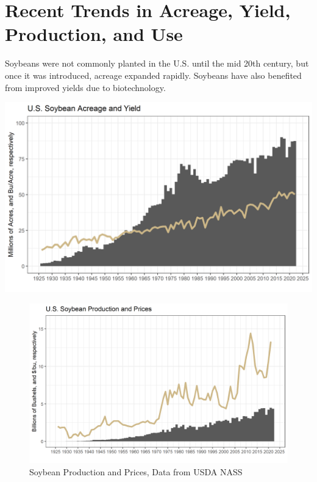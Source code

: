 \documentclass[
]{book}
\begin{document}
\hypertarget{recent-trends-in-acreage-yield-production-and-use-1}{%
\section{Recent Trends in Acreage, Yield, Production, and Use}\label{recent-trends-in-acreage-yield-production-and-use-1}}

Soybeans were not commonly planted in the U.S. until the mid 20th century, but once it was introduced, acreage expanded rapidly. Soybeans have also benefited from improved yields due to biotechnology.

\href{Soybean\%20Acres\%20and\%20Yield,\%20Data\%20from\%20USDA\%20NASS}{\includegraphics{assets/PrimerforGrain_SoyAcandY.png}}

\begin{figure}
\centering
\includegraphics{assets/PrimerforGrain_SoyProdand$.png}
\caption{Soybean Production and Prices, Data from USDA NASS}
\end{figure}
\end{document}
